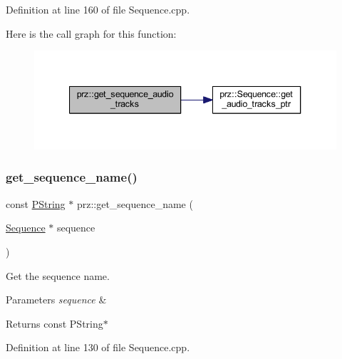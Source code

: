 Definition at line 160 of file Sequence.\+cpp.

Here is the call graph for this function\+:
\nopagebreak
\begin{figure}[H]
\begin{center}
\leavevmode
\includegraphics[width=340pt]{namespaceprz_ac5117548474c20a5c1e5ac0998a7c89f_cgraph}
\end{center}
\end{figure}
\mbox{\label{namespaceprz_a330a844981433fc9a6bb57a32bcdc7d4}} 
\subsubsection{\texorpdfstring{get\_sequence\_name()}{get\_sequence\_name()}}
{\footnotesize\ttfamily const \mbox{\hyperlink{classprz_1_1_p_string}{P\+String}} $\ast$ prz\+::get\+\_\+sequence\+\_\+name (\begin{DoxyParamCaption}\item[{\mbox{\hyperlink{classprz_1_1_sequence}{Sequence}} $\ast$}]{sequence }\end{DoxyParamCaption})}



Get the sequence name. 


\begin{DoxyParams}{Parameters}
{\em sequence} & \\
\hline
\end{DoxyParams}
\begin{DoxyReturn}{Returns}
const P\+String$\ast$ 
\end{DoxyReturn}


Definition at line 130 of file Sequence.\+cpp.

